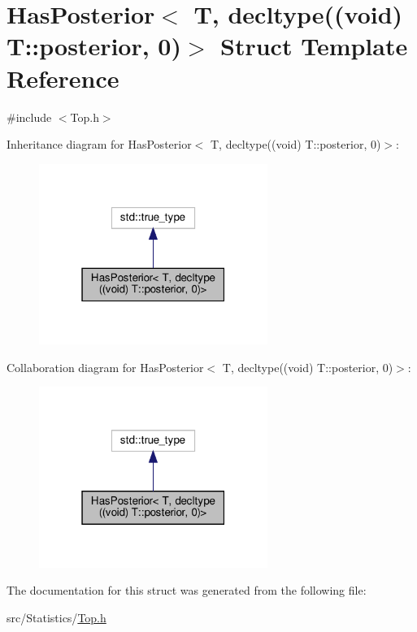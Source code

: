 \hypertarget{struct_has_posterior_3_01_t_00_01decltype_07_07void_08_01_t_1_1posterior_00_010_08_4}{}\section{Has\+Posterior$<$ T, decltype((void) T\+:\+:posterior, 0)$>$ Struct Template Reference}
\label{struct_has_posterior_3_01_t_00_01decltype_07_07void_08_01_t_1_1posterior_00_010_08_4}


{\ttfamily \#include $<$Top.\+h$>$}



Inheritance diagram for Has\+Posterior$<$ T, decltype((void) T\+:\+:posterior, 0)$>$\+:
\nopagebreak
\begin{figure}[H]
\begin{center}
\leavevmode
\includegraphics[width=211pt]{struct_has_posterior_3_01_t_00_01decltype_07_07void_08_01_t_1_1posterior_00_010_08_4__inherit__graph}
\end{center}
\end{figure}


Collaboration diagram for Has\+Posterior$<$ T, decltype((void) T\+:\+:posterior, 0)$>$\+:
\nopagebreak
\begin{figure}[H]
\begin{center}
\leavevmode
\includegraphics[width=211pt]{struct_has_posterior_3_01_t_00_01decltype_07_07void_08_01_t_1_1posterior_00_010_08_4__coll__graph}
\end{center}
\end{figure}


The documentation for this struct was generated from the following file\+:\begin{DoxyCompactItemize}
\item 
src/\+Statistics/\hyperlink{_top_8h}{Top.\+h}\end{DoxyCompactItemize}
